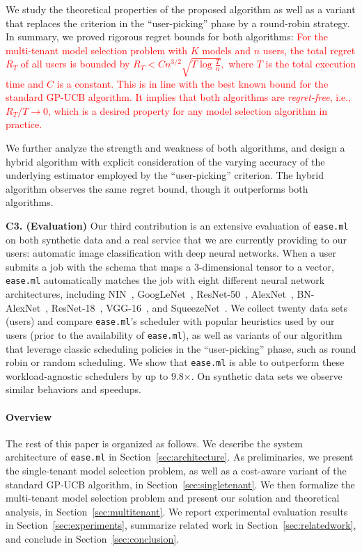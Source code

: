 \documentclass[letterpaper]{vldb}
\newcommand{\eml}{\texttt{ease.ml}\xspace}
\begin{document}
We study the theoretical properties of the proposed algorithm as well as a variant that replaces the criterion in the ``user-picking'' phase by a round-robin strategy.
In summary, we proved rigorous regret bounds for both algorithms: \textcolor{red}{For the multi-tenant model selection problem 
with $K$ models and $n$ users, 
the total regret $R_T$ of all users is bounded by 
$
R_T < C n^{3/2}\sqrt{T\log \frac{T}{n}}, 
$
where $T$ is the total execution time
and $C$ is a constant.
This is in line with the best known bound for the standard GP-UCB algorithm.
It implies that both algorithms are \emph{regret-free}, i.e., $R_T/T \rightarrow 0$, which is a desired property for any model selection algorithm in practice.
}

We further analyze the strength and weakness of both algorithms, and design a hybrid algorithm with explicit consideration
of the varying accuracy of the underlying estimator employed by the ``user-picking'' criterion.
The hybrid algorithm observes the same regret bound, though it outperforms both algorithms.


\vspace{0.5em}
\noindent
{\bf C3. (Evaluation)} Our third contribution is an extensive
evaluation of \eml on both synthetic data and a real service that we are currently providing to our users: automatic image classification 
with deep neural networks.
When a user submits a job with the schema
that maps a 3-dimensional tensor to
a vector, \eml automatically matches the job with eight
different neural network architectures, including
NIN~\cite{XXX}, GoogLeNet~\cite{XXX}, ResNet-50~\cite{XXX}, AlexNet~\cite{XXX},
BN-AlexNet~\cite{XXX}, ResNet-18~\cite{XXX}, VGG-16~\cite{XXX},
and SqueezeNet~\cite{XXX}. We collect twenty 
data sets (users) and compare
\eml's scheduler with popular heuristics 
used by our users (prior to the availability of \eml), as well as variants of our algorithm that leverage classic scheduling policies in the ``user-picking'' phase, such as round robin or random scheduling.
We show that \eml is able to outperform
these workload-agnostic schedulers
by up to 9.8$\times$. On synthetic data sets
we observe similar behaviors and speedups.

\vspace{-1em}
\paragraph*{Overview}
The rest of this paper is organized as follows.
We describe the system architecture of \eml in Section~\ref{sec:architecture}.
As preliminaries, we present the single-tenant model selection problem, as well as a cost-aware variant of the standard GP-UCB algorithm, in Section~\ref{sec:singletenant}.
We then formalize the multi-tenant model selection problem and present our solution and theoretical analysis, in Section~\ref{sec:multitenant}.
We report experimental evaluation results in Section~\ref{sec:experiments}, summarize related work in Section~\ref{sec:relatedwork}, and conclude in Section~\ref{sec:conclusion}.
\end{document}
